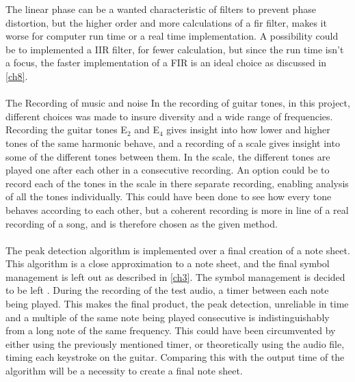 The linear phase can be a wanted characteristic of filters to prevent phase distortion, but the higher order and more calculations of a fir filter, makes it worse for computer run time or a real time implementation. 
A possibility could be to implemented a IIR filter, for fewer calculation, but since the run time isn't a focus, the faster implementation of a FIR is an ideal choice as discussed in \ref{ch8}.
\\\\
The Recording of music and noise 
In the recording of guitar tones, in this project, different choices was made to insure diversity and a wide range of frequencies.
Recording the guitar tones E$_2$ and E$_4$ gives insight into how lower and higher tones of the same harmonic behave, and a recording of a scale gives insight into some of the different tones between them.
In the scale, the different tones are played one after each other in a consecutive recording. 
An option could be to record each of the tones in the scale in there separate recording, enabling analysis of all the tones individually.
This could have been done to see how every tone behaves according to each other, but a coherent recording is more in line of a real recording of a song, and is therefore chosen as the given method.
\\\\
The peak detection algorithm is implemented over a final creation of a note sheet.
This algorithm is a close approximation to a note sheet, and the final symbol management is left out as described in \ref{ch3}.
The symbol management is decided to be left .
During the recording of the test audio, a timer between each note being played.
This makes the final product, the peak detection, unreliable in time and a multiple of the same note being played consecutive is indistinguishably from a long note of the same frequency.
This could have been circumvented by either using the previously mentioned timer, or theoretically using the audio file, timing each keystroke on the guitar.
Comparing this with the output time of the algorithm will be a necessity to create a final note sheet.





